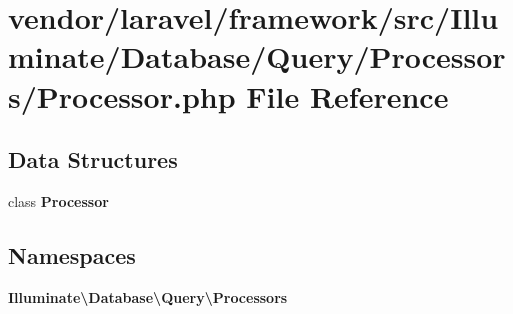 \section{vendor/laravel/framework/src/\+Illuminate/\+Database/\+Query/\+Processors/\+Processor.php File Reference}
\label{_processor_8php}
\subsection*{Data Structures}
\begin{DoxyCompactItemize}
\item 
class {\bf Processor}
\end{DoxyCompactItemize}
\subsection*{Namespaces}
\begin{DoxyCompactItemize}
\item 
 {\bf Illuminate\textbackslash{}\+Database\textbackslash{}\+Query\textbackslash{}\+Processors}
\end{DoxyCompactItemize}

